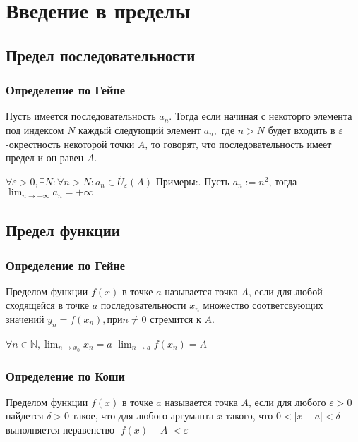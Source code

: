 \chapter{Введение в пределы}
\section{Предел последовательности}
\subsection{Определение по Гейне}
Пусть имеется последовательность $a_n$. Тогда если начиная с некоторго элемента под индексом $N$ каждый следующий элемент $a_n,$ где $n>N$ будет входить в $\varepsilon$-окрестность некоторой точки $A$, то говорят, что последовательность имеет предел и он равен $A$. \newline

$\forall \varepsilon > 0, \exists N : \forall n > N: a_n \in \mathring{U_\varepsilon}(A)$\newline
Примеры:. Пусть $a_n:=n^2$, тогда \newline
$\displaystyle \lim_{n \to +\infty} a_n = +\infty $

\section{Предел функции}
\subsection{Определение по Гейне}
Пределом функции $f(x)$ в точке $a$ называется точка $A$, если для любой сходящейся в точке $a$ последовательности $x_n$ множество соответсвующих значений $y_n = f(x_n), при n \neq 0$ стремится к $A$.\newline

$\displaystyle \forall n \in \mathbb{N}, \lim_{n \to x_0} x_n = a$ \newline
$\displaystyle \lim_{n \to a} f(x_n) = A$

\subsection{Определение по Коши}
Пределом функции $f(x)$ в точке $a$ называется точка $A$, если для любого $\varepsilon > 0$ найдется $\delta > 0$ такое, что для любого аргуманта $x$ такого, что $0 < |x - a| < \delta$ выполняется неравенство $|f(x) - A| < \varepsilon $ \newline

